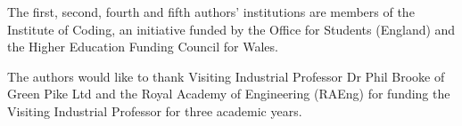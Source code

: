 \documentclass[conference]{IEEEtran}
\begin{document}

The first, second, fourth and fifth authors' institutions are members of the Institute of Coding, an initiative funded by the Office for Students (England) and the Higher Education Funding Council for Wales.

The authors would like to thank Visiting Industrial Professor Dr Phil Brooke of Green Pike Ltd and the Royal Academy of Engineering (RAEng) for funding the Visiting Industrial Professor for three academic years.



%

\end{document}
